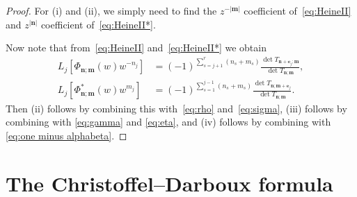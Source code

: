 \documentclass[reqno,centertags,11pt,draft]{amsart}
\begin{document}
\begin{proof}
    For (i) and (ii), we simply need to find the $z^{-|\bm{m}|}$ coefficient of~\eqref{eq:HeineII} and $z^{|\bm{n}|}$ coefficient of~\eqref{eq:HeineII*}.
    
    Now note that from~\eqref{eq:HeineII} and~\eqref{eq:HeineII*} we obtain
    \begin{align}
    \label{eq:norm1}
        L_j[\Phi_{\bm{n};\bm{m}}(w)w^{-n_j}]
        & = (-1)^{\sum_{s=j+1}^r (n_s+m_s)} \frac{\det T_{\bm{n}+\bm{e}_j;\bm{m}}}{\det T_{\bm{n};\bm{m}}},
        \\
        \label{eq:norm2}
        L_j[\Phi^*_{\bm{n};\bm{m}}(w)w^{m_j}]
        & =  (-1)^{\sum_{s=1}^{j-1} (n_s+m_s)} \frac{\det T_{\bm{n};\bm{m}+\bm{e}_j}}{\det T_{\bm{n};\bm{m}}}.
    \end{align}
    Then (ii) follows by combining this with~\eqref{eq:rho} and~\eqref{eq:sigma}, (iii) follows by combining with \eqref{eq:gamma} and \eqref{eq:eta}, and (iv) follows by combining with \eqref{eq:one minus alphabeta}.
\end{proof}




\section{The Christoffel--Darboux formula}\label{ss:CD}
\end{document}
